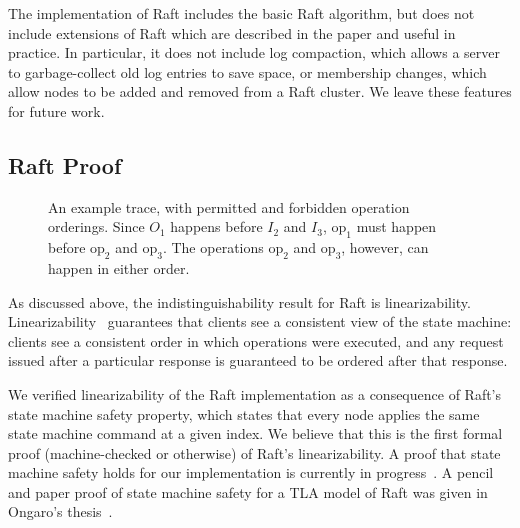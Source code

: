 The \Verdi implementation of Raft includes the basic Raft algorithm,
but does not include extensions of Raft which are described in the
paper and useful in practice. In particular, it does not include log
compaction, which allows a server to garbage-collect old log entries
to save space, or membership changes, which allow nodes to be added
and removed from a Raft cluster. We leave these features for future
work.

\subsection{Raft Proof}\label{ssec:verdi:raft-proof}

\begin{figure}[t]
  \centering
  

  \caption{An example trace, with permitted and forbidden operation
    orderings. Since $O_1$ happens before $I_2$ and $I_3$,
    $\mathrm{op}_1$ must happen before $\mathrm{op}_2$ and
    $\mathrm{op}_3$. The operations $\mathrm{op}_2$ and
    $\mathrm{op}_3$, however, can happen in either order.}

\label{fig:linearizability-diagram}
\end{figure}


As discussed above, the indistinguishability result for Raft is
linearizability. Linearizability~\cite{herlihy:linearizability}
guarantees that clients see a consistent view of the state machine:
clients see a consistent order in which operations were executed, and
any request issued after a particular response is guaranteed to be
ordered after that response.

We verified linearizability of the \Verdi Raft implementation as a
consequence of Raft's state machine safety property, which
states that every node applies the same state machine command at a
given index. We believe that this is the first formal proof
(machine-checked or otherwise) of Raft's linearizability. A proof that
state machine safety holds for our implementation is currently in
progress~\cite{verdi-repo}. A pencil and paper proof of state machine
safety for a TLA model of Raft was given in Ongaro's
thesis~.

